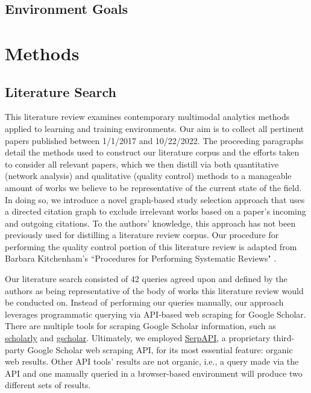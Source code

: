 \documentclass[manuscript,screen,review]{acmart}
\begin{document}
\subsection{Environment Goals}

\section{Methods} \label{sec:methods} %


\subsection{Literature Search} \label{subsec:literature_search}

This literature review examines contemporary multimodal analytics methods applied to learning and training environments. Our aim is to collect all pertinent papers published between 1/1/2017 and 10/22/2022. The proceeding paragraphs detail the methods used to construct our literature corpus and the efforts taken to consider all relevant papers, which we then distill via both quantitative (network analysis) and qualitative (quality control) methods to a manageable amount of works we believe to be representative of the current state of the field. In doing so, we introduce a novel graph-based study selection approach that uses a directed citation graph to exclude irrelevant works based on a paper's incoming and outgoing citations. To the authors' knowledge, this approach has not been previously used for distilling a literature review corpus. Our procedure for performing the quality control portion of this literature review is adapted from Barbara Kitchenham's ``Procedures for Performing Systematic Reviews" \cite{kitchenham2004procedures}.

Our literature search consisted of 42 queries agreed upon and defined by the authors as being representative of the body of works this literature review would be conducted on. Instead of performing our queries manually, our approach leverages programmatic querying via API-based web scraping for Google Scholar. There are multiple tools for scraping Google Scholar information, such as \href{https://pypi.org/project/scholarly/}{scholarly} and \href{https://github.com/venthur/gscholar}{gscholar}. Ultimately, we employed \href{https://serpapi.com/google-scholar-api}{SerpAPI}, a proprietary third-party Google Scholar web scraping API, for its most essential feature: organic web results. Other API tools' results are not organic, i.e., a query made via the API and one manually queried in a browser-based environment will produce two different sets of results.
\end{document}
